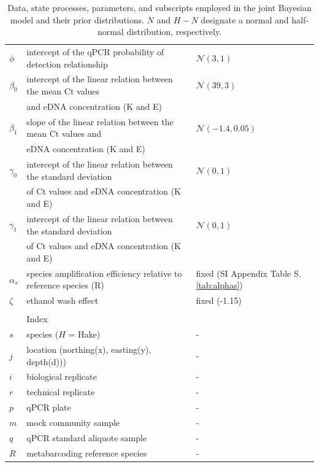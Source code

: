 \documentclass{article}
\begin{document}
\begin{table}[h]
\begin{tabular}{lll}
$\phi$& intercept of the qPCR probability of detection relationship & $\mathcal{N}(3,1)$\\
$\beta_0$& intercept of the linear relation between the mean Ct values&$\mathcal{N}(39,3)$\\
&and eDNA concentration (K and E) & \\
$\beta_1$& slope of the linear relation between the mean Ct values and &$\mathcal{N}(-1.4,0.05)$\\
&eDNA concentration (K and E) & \\
$\gamma_0$& intercept of the linear relation between the standard deviation&$\mathcal{N}(0,1)$\\
&of Ct values and eDNA concentration (K and E) & \\
$\gamma_1$& intercept of the linear relation between the standard deviation &$\mathcal{N}(0,1)$\\
&of Ct values and eDNA concentration (K and E) & \\
$\alpha_s$& species amplification efficiency relative to reference species (R) & fixed (SI Appendix Table S.\ref{tab:alphas})\\
$\zeta$& ethanol wash effect & fixed (-1.15)\\
&&\\
&Index&\\
\hline
$s$& species ($H$ = Hake) & -\\
$j$& location (northing(x), easting(y), depth(d)))& -\\
$i$& biological replicate & -\\
$r$& technical replicate & -\\
$p$& qPCR plate & -\\
$m$& mock community sample & -\\
$q$& qPCR standard aliquote sample & -\\
$R$& metabarcoding reference species & -\\


    \end{tabular}
    \caption{Data, state processes, parameters, and subscripts employed in the joint Bayesian model and their prior distributions.  $N$ and $H-N$ designate a normal and half-normal distribution, respectively.}
    \label{tab:priortable}
\end{table}
\end{document}
